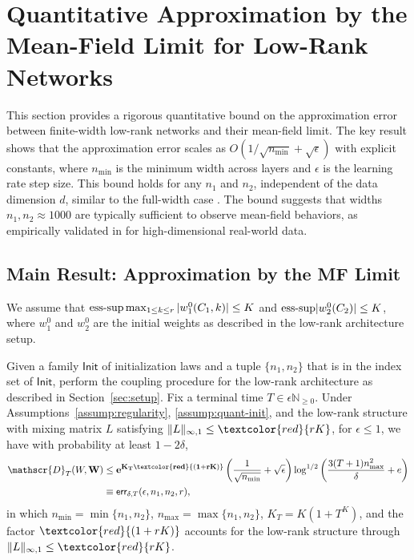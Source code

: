 \section{Quantitative Approximation by the Mean-Field Limit for Low-Rank Networks}
\label{sec:quantitative}

This section provides a rigorous quantitative bound on the approximation error between finite-width low-rank networks and their mean-field limit. The key result shows that the approximation error scales as $O(1/\sqrt{n_{\min}} + \sqrt{\epsilon})$ with explicit constants, where $n_{\min}$ is the minimum width across layers and $\epsilon$ is the learning rate step size. This bound holds for any $n_1$ and $n_2$, independent of the data dimension $d$, similar to the full-width case \cite{nguyen2020global,araujo2019mean}. The bound suggests that widths $n_1, n_2 \approx 1000$ are typically sufficient to observe mean-field behaviors, as empirically validated in \cite{nguyen2019meanfield} for high-dimensional real-world data.

\subsection{Main Result: Approximation by the MF Limit}

\begin{assumption}
\label{assump:quant-init}
We assume that ${\rm ess\text{-}sup}\max_{1\le k\le r}|w_1^0(C_1,k)| \le K$ and ${\rm ess\text{-}sup}|w_2^0(C_2)| \le K$, where $w_1^0$ and $w_2^0$ are the initial weights as described in the low-rank architecture setup.
\end{assumption}

\begin{theorem}
\label{thm:quantitative-lowrank}
Given a family $\mathsf{Init}$ of initialization laws and a tuple $\{n_1, n_2\}$ that is in the index set of $\mathsf{Init}$, perform the coupling procedure for the low-rank architecture as described in Section~\ref{sec:setup}. Fix a terminal time $T \in \epsilon\mathbb{N}_{\ge 0}$. Under Assumptions~\ref{assump:regularity}, \ref{assump:quant-init}, and the low-rank structure with mixing matrix $L$ satisfying $\|L\|_{\infty,1} \le \textcolor{red}{rK}$, for $\epsilon \le 1$, we have with probability at least $1-2\delta$,
\begin{align*}
\mathscr{D}_T(W, \mathbf{W}) &\le \mathbf{e^{K_T\textcolor{red}{(1+rK)}}}\left(\frac{1}{\sqrt{n_{\min}}} + \sqrt{\epsilon}\right)\log^{1/2}\left(\frac{3(T+1)n_{\max}^2}{\delta} + e\right) \\
&\equiv \mathsf{err}_{\delta,T}(\epsilon, n_1, n_2, r),
\end{align*}
in which $n_{\min} = \min\{n_1, n_2\}$, $n_{\max} = \max\{n_1, n_2\}$, $K_T = K(1+T^K)$, and the factor $\textcolor{red}{(1+rK)}$ accounts for the low-rank structure through $\|L\|_{\infty,1} \le \textcolor{red}{rK}$.
\end{theorem}

